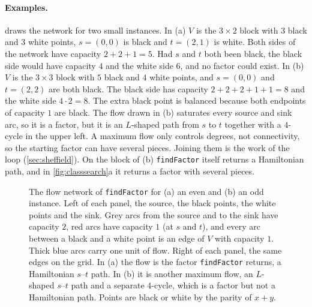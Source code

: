 \documentclass[11pt]{article}
\theoremstyle{plain}
\theoremstyle{definition}
\theoremstyle{remark}
\newcommand{\lean}[1]{\texttt{#1}}
\begin{document}
\paragraph{Examples.}
 draws the network for two small instances.
In (a) $V$ is the $3\times2$ block with $3$ black and $3$ white points, $s=(0,0)$ is black and
$t=(2,1)$ is white.
Both sides of the network have capacity $2+2+1=5$.
Had $s$ and $t$ both been black, the black side would have capacity $4$ and the white side $6$, and
no factor could exist.
In (b) $V$ is the $3\times3$ block with $5$ black and $4$ white points, and $s=(0,0)$ and $t=(2,2)$
are both black.
The black side has capacity $2+2+2+1+1=8$ and the white side $4\cdot2=8$.
The extra black point is balanced because both endpoints of capacity $1$ are black.
The flow drawn in (b) saturates every source and sink arc, so it is a factor, but it is an
$L$-shaped path from $s$ to $t$ together with a $4$-cycle in the upper left.
A maximum flow only controls degrees, not connectivity, so the starting factor can have several
pieces.
Joining them is the work of the loop (\cref{sec:sheffield}).
On the block of (b) \lean{findFactor} itself returns a Hamiltonian path, and in \cref{fig:classsearch}a it
returns a factor with several pieces.

\begin{figure}[H]
\centering

\caption{The flow network of \lean{findFactor} for (a) an even and (b) an odd instance.
Left of each panel, the source, the black points, the white points and the sink.
Grey arcs from the source and to the sink have capacity $2$, red arcs have capacity $1$ (at $s$ and
$t$), and every arc between a black and a white point is an edge of $V$ with capacity $1$.
Thick blue arcs carry one unit of flow.
Right of each panel, the same edges on the grid.
In (a) the flow is the factor \lean{findFactor} returns, a Hamiltonian $s$--$t$ path.
In (b) it is another maximum flow, an $L$-shaped $s$--$t$ path and a separate $4$-cycle, which is a
factor but not a Hamiltonian path.
Points are black or white by the parity of $x+y$.}
\label{fig:flow}
\end{figure}



\end{document}
